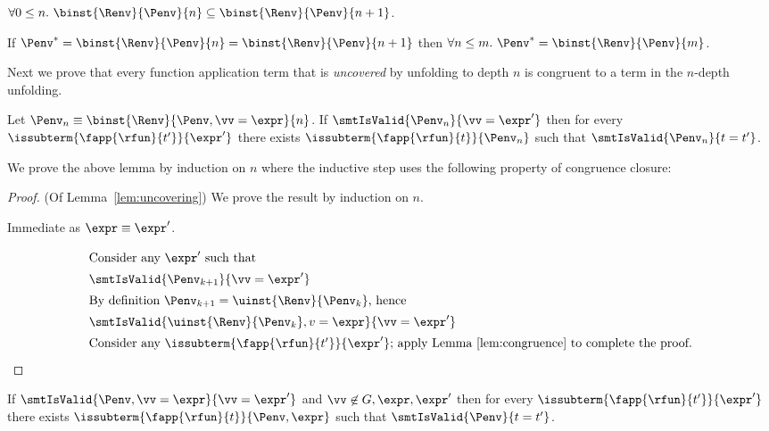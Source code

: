 \begin{lemma} \label{lem:bounded:mono}
$\forall 0 \leq n.\ \binst{\Renv}{\Penv}{n} \subseteq \binst{\Renv}{\Penv}{n + 1}$.
\end{lemma}

\begin{lemma} \label{lem:bounded:fix}
If $\Penv^* = \binst{\Renv}{\Penv}{n} = \binst{\Renv}{\Penv}{n + 1}$
then $\forall n \leq m.\ \Penv^* = \binst{\Renv}{\Penv}{m}$.
\end{lemma}

%
Next we prove that every function application
term that is \emph{uncovered} by unfolding to
depth $n$ is congruent to a term in the $n$-depth
unfolding.

\begin{lemma} \label{lem:uncovering}
Let $\Penv_n \equiv \binst{\Renv}{\Penv, \vv = \expr}{n}$.
If   $\smtIsValid{\Penv_n}{\vv = \expr'}$
then for every $\issubterm{\fapp{\rfun}{t'}}{\expr'}$
       there exists $\issubterm{\fapp{\rfun}{t}}{\Penv_n}$
         such that $\smtIsValid{\Penv_n}{t = t'}$.
\end{lemma}

We prove the above lemma by induction on $n$
where the inductive step uses the following
property of congruence closure:

\begin{proof} (Of Lemma~\ref{lem:uncovering})
We prove the result by induction on $n$.

Immediate as $\expr \equiv \expr'$.

  \begin{align*}
  \intertext{Consider any $\expr'$ such that}
  & \smtIsValid{\Penv_{k+1}}{\vv = \expr'} \\
  \intertext{By definition $\Penv_{k+1} = \uinst{\Renv}{\Penv_k}$, hence}
  & \smtIsValid{\uinst{\Renv}{\Penv_k}, v = \expr}{\vv = \expr'} \\
  \intertext{Consider any $\issubterm{\fapp{\rfun}{t'}}{\expr'}$;
  apply Lemma~\ref{lem:congruence} to complete the proof.}
  \end{align*}
\end{proof}

\begin{lemma} \label{lem:congruence}
If   $\smtIsValid{\Penv, \vv = \expr}{\vv = \expr'}$
     and
     $\vv \not \in G, \expr, \expr'$
then for every $\issubterm{\fapp{\rfun}{t'}}{\expr'}$
       there exists $\issubterm{\fapp{\rfun}{t}}{\Penv, \expr}$
         such that $\smtIsValid{\Penv}{t = t'}$.
\end{lemma}

